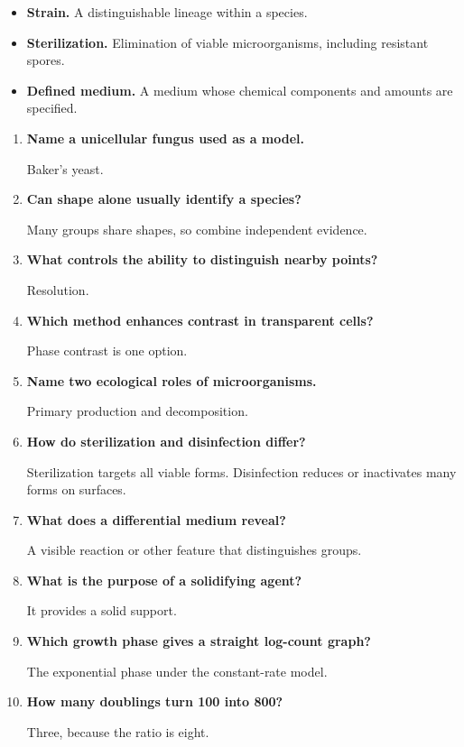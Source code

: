 \documentclass[12pt,a4paper]{article}
\newcommand{\Q}[1]{\textbf{#1}\par\noindent\ignorespaces}
\begin{document}
\begin{tcolorbox}[defbox, title={One-Line Definitions}]
\begin{itemize}[leftmargin=*, itemsep=3pt, topsep=4pt]
  \item \textbf{Strain.} A distinguishable lineage within a species.
  \item \textbf{Sterilization.} Elimination of viable microorganisms, including resistant spores.
  \item \textbf{Defined medium.} A medium whose chemical components and amounts are specified.
\end{itemize}
\end{tcolorbox}

\begin{tcolorbox}[exambox, title={Frequently Asked / Viva Questions}]
\begin{enumerate}[topsep=0pt, label=\textbf{Q\arabic*.}, itemsep=5pt, leftmargin=*]
  \item \Q{Name a unicellular fungus used as a model.}
    Baker's yeast.
  \item \Q{Can shape alone usually identify a species?}
    Many groups share shapes, so combine independent evidence.
  \item \Q{What controls the ability to distinguish nearby points?}
    Resolution.
  \item \Q{Which method enhances contrast in transparent cells?}
    Phase contrast is one option.
  \item \Q{Name two ecological roles of microorganisms.}
    Primary production and decomposition.
  \item \Q{How do sterilization and disinfection differ?}
    Sterilization targets all viable forms. Disinfection reduces or inactivates many forms on surfaces.
  \item \Q{What does a differential medium reveal?}
    A visible reaction or other feature that distinguishes groups.
  \item \Q{What is the purpose of a solidifying agent?}
    It provides a solid support.
  \item \Q{Which growth phase gives a straight log-count graph?}
    The exponential phase under the constant-rate model.
  \item \Q{How many doublings turn 100 into 800?}
    Three, because the ratio is eight.
\end{enumerate}
\end{tcolorbox}
\end{document}
